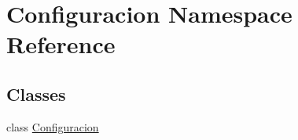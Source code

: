 \hypertarget{namespace_configuracion}{}\section{Configuracion Namespace Reference}
\label{namespace_configuracion}
\subsection*{Classes}
\begin{DoxyCompactItemize}
\item 
class \mbox{\hyperlink{class_configuracion_1_1_configuracion}{Configuracion}}
\end{DoxyCompactItemize}
